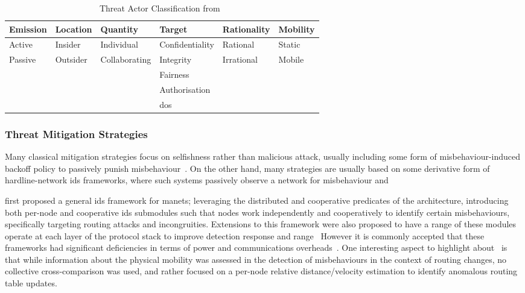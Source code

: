 \begin{table}
  \caption[Threat Actor Classification]{Threat Actor Classification from~\citet{Gagandeep2012}}
  \label{tab:attacker_class}
  \begin{tabularx}{\textwidth}{X X X X X X}\toprule
    Emission & Location & Quantity & Target & Rationality & Mobility \\\midrule
    Active & Insider & Individual & Confidentiality & Rational & Static\\
    Passive & Outsider & Collaborating & Integrity & Irrational & Mobile\\
            &         &               & Fairness & & \\
            &         &               & Authorisation & &\\
            &         &               &  \gls{dos} & &\\
    \bottomrule
    
  \end{tabularx}
\end{table}


\subsubsection{Threat Mitigation Strategies}



Many classical mitigation strategies focus on selfishness rather than malicious attack, usually including some form of misbehaviour-induced backoff policy to passively punish misbehaviour~\cite{Konorski2002,Cardenas:2004:DPM:1029102.1029107}.
On the other hand, many  strategies are usually based on some derivative form of hardline-network \gls{ids} frameworks, where such systems passively observe a network for misbehaviour and 

\citet{zhang2003intrusion} first proposed a general \gls{ids} framework for \glspl{manet}; leveraging the distributed and cooperative predicates of the architecture, introducing both per-node and cooperative \gls{ids} submodules such that nodes work independently and cooperatively to identify certain misbehaviours, specifically targeting routing attacks and incongruities.
Extensions to this framework were also proposed to have a range of these modules operate at each layer of the protocol stack to improve detection response and range~\cite{Parker2006}
However it is commonly accepted that these frameworks had significant deficiencies in terms of power and communications overheads~\cite{csen2010security,Ryu2008}.
One interesting aspect to highlight about~\citet{zhang2003intrusion} is that while information about the physical mobility was assessed in the detection of misbehaviours in the context of routing changes, no collective cross-comparison was used, and rather focused on a per-node relative distance/velocity estimation to identify anomalous routing table updates.

